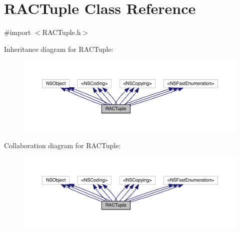 \hypertarget{interface_r_a_c_tuple}{}\section{R\+A\+C\+Tuple Class Reference}
\label{interface_r_a_c_tuple}


{\ttfamily \#import $<$R\+A\+C\+Tuple.\+h$>$}



Inheritance diagram for R\+A\+C\+Tuple\+:\nopagebreak
\begin{figure}[H]
\begin{center}
\leavevmode
\includegraphics[width=350pt]{interface_r_a_c_tuple__inherit__graph}
\end{center}
\end{figure}


Collaboration diagram for R\+A\+C\+Tuple\+:\nopagebreak
\begin{figure}[H]
\begin{center}
\leavevmode
\includegraphics[width=350pt]{interface_r_a_c_tuple__coll__graph}
\end{center}
\end{figure}
